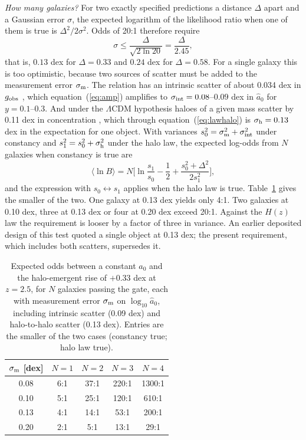 \documentclass[fleqn,usenatbib]{mnras}
\begin{document}
\emph{How many galaxies?} For two exactly specified predictions a distance $\Delta$ apart and a Gaussian error $\sigma$, the expected logarithm of the likelihood ratio when one of them is true is $\Delta^2/2\sigma^2$. Odds of 20:1 \citep[strong evidence on the scale of][]{KassRaftery1995} therefore require
\begin{equation}
\sigma\le\frac{\Delta}{\sqrt{2\ln20}}=\frac{\Delta}{2.45} ,
\label{eq:sigma}
\end{equation}
that is, $0.13$ dex for $\Delta=0.33$ and $0.24$ dex for $\Delta=0.58$. For a single galaxy this is too optimistic, because two sources of scatter must be added to the measurement error $\sigma_{\rm m}$. The relation has an intrinsic scatter of about 0.034 dex in $g_{\rm obs}$ \citep{Desmond2023}, which equation~(\ref{eq:amp}) amplifies to $\sigma_{\rm int}=0.08$--$0.09$ dex in $\hat a_0$ for $y=0.1$--$0.3$. And under the $\Lambda$CDM hypothesis haloes of a given mass scatter by 0.11 dex in concentration \citep{DuttonMaccio2014}, which through equation~(\ref{eq:lawhalo}) is $\sigma_{\rm h}=0.13$ dex in the expectation for one object. With variances $s_0^2=\sigma_{\rm m}^2+\sigma_{\rm int}^2$ under constancy and $s_1^2=s_0^2+\sigma_{\rm h}^2$ under the halo law, the expected log-odds from $N$ galaxies when constancy is true are
\begin{equation}
\langle\ln B\rangle=N\Big[\ln\frac{s_1}{s_0}-\frac12+\frac{s_0^2+\Delta^2}{2s_1^2}\Big],
\label{eq:lnB}
\end{equation}
and the expression with $s_0\leftrightarrow s_1$ applies when the halo law is true. Table~\ref{tab:odds} gives the smaller of the two. One galaxy at 0.13 dex yields only 4:1. Two galaxies at 0.10 dex, three at 0.13 dex or four at 0.20 dex exceed 20:1. Against the $H(z)$ law the requirement is looser by a factor of three in variance. An earlier deposited design of this test \citep{Zimmerman2026a0z} quoted a single object at 0.13 dex; the present requirement, which includes both scatters, supersedes it.

\begin{table}
\caption{Expected odds between a constant $a_0$ and the halo-emergent rise of $+0.33$ dex at $z=2.5$, for $N$ galaxies passing the gate, each with measurement error $\sigma_{\rm m}$ on $\log_{10}\hat a_0$, including intrinsic scatter (0.09 dex) and halo-to-halo scatter (0.13 dex). Entries are the smaller of the two cases (constancy true; halo law true).}
\label{tab:odds}
\begin{tabular}{ccccc}
\toprule
$\sigma_{\rm m}$ [dex] & $N=1$ & $N=2$ & $N=3$ & $N=4$\\
\midrule
0.08 & 6:1 & 37:1 & 220:1 & 1300:1\\
0.10 & 5:1 & 25:1 & 120:1 & 610:1\\
0.13 & 4:1 & 14:1 & 53:1 & 200:1\\
0.20 & 2:1 & 5:1 & 13:1 & 29:1\\
\bottomrule
\end{tabular}
\end{table}
\end{document}
